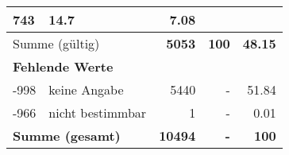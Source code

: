 \begin{longtable}{lXrrr}
       \num{743} &
       \num[round-mode=places,round-precision=2]{14,7} &
         \num[round-mode=places,round-precision=2]{7,08} \\
     \midrule
     \multicolumn{2}{l}{Summe (gültig)} &
       \textbf{\num{5053}} &
     \textbf{100} &
       \textbf{\num[round-mode=places,round-precision=2]{48,15}} \\
     \multicolumn{5}{l}{\textbf{Fehlende Werte}}\\
       -998 &
       keine Angabe &
         \num{5440} &
        - &
         \num[round-mode=places,round-precision=2]{51,84} \\
       -966 &
       nicht bestimmbar &
         \num{1} &
        - &
         \num[round-mode=places,round-precision=2]{0,01} \\
     \midrule
     \multicolumn{2}{l}{\textbf{Summe (gesamt)}} &
          \textbf{\num{10494}} &
        \textbf{-} &
        \textbf{100} \\
     \bottomrule
     \end{longtable}
     
